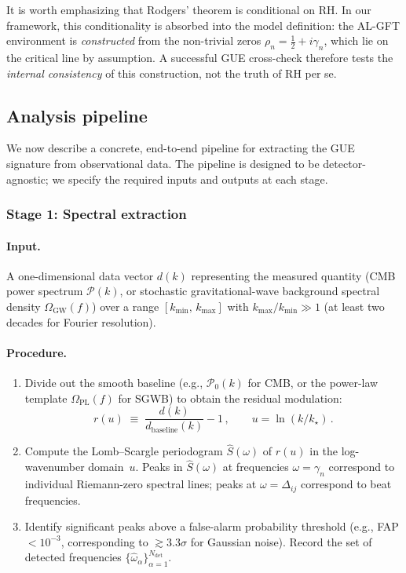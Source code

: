 \documentclass[12pt,a4paper]{article}
\begin{document}
\noindent
It is worth emphasizing that Rodgers' theorem is conditional
on RH.  In our framework, this conditionality is absorbed
into the model definition: the AL-GFT environment is
\emph{constructed} from the non-trivial zeros
$\rho_n = \tfrac{1}{2}+i\gamma_n$, which lie on the
critical line by assumption.
A successful GUE cross-check therefore tests the
\emph{internal consistency} of this construction,
not the truth of RH per se.


\subsection{Analysis pipeline}
\label{sec:pipeline}

We now describe a concrete, end-to-end pipeline for
extracting the GUE signature from observational data.
The pipeline is designed to be detector-agnostic; we
specify the required inputs and outputs at each stage.

\subsubsection{Stage 1: Spectral extraction}

\paragraph{Input.}
A one-dimensional data vector $d(k)$ representing
the measured quantity (CMB power spectrum $\mathcal{P}(k)$,
or stochastic gravitational-wave background spectral
density $\Omega_{\mathrm{GW}}(f)$) over a range
$[k_{\min},\,k_{\max}]$ with $k_{\max}/k_{\min}\gg 1$
(at least two decades for Fourier resolution).

\paragraph{Procedure.}
\begin{enumerate}
\item Divide out the smooth baseline
  (e.g., $\mathcal{P}_0(k)$ for CMB,
  or the power-law template $\Omega_{\mathrm{PL}}(f)$
  for SGWB) to obtain the residual modulation:
  \begin{equation}\label{eq:residual}
    r(u) \;\equiv\;
    \frac{d(k)}{d_{\mathrm{baseline}}(k)} - 1\,,
    \qquad u = \ln(k/k_\star)\,.
  \end{equation}

\item Compute the Lomb--Scargle periodogram
  $\hat{S}(\omega)$ of $r(u)$ in the log-wavenumber
  domain~$u$.  Peaks in $\hat{S}(\omega)$ at frequencies
  $\omega = \gamma_n$ correspond to individual Riemann-zero
  spectral lines; peaks at $\omega = \Delta_{ij}$
  correspond to beat frequencies.

\item Identify significant peaks above a
  false-alarm probability threshold
  (e.g., FAP $<10^{-3}$, corresponding to
  $\gtrsim 3.3\sigma$ for Gaussian noise).
  Record the set of detected frequencies
  $\{\hat\omega_\alpha\}_{\alpha=1}^{N_{\mathrm{det}}}$.
\end{enumerate}
\end{document}
